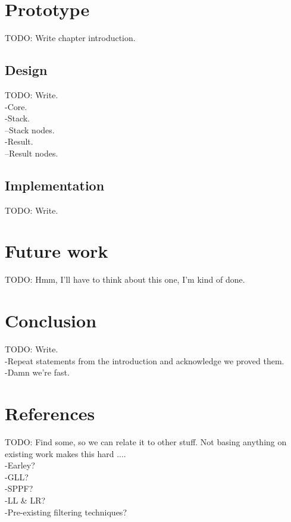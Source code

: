 \documentclass[a4paper,10pt]{article}
\begin{document}
\section{Prototype}

TODO: Write chapter introduction.

\subsection{Design}

TODO: Write.\\
-Core.\\
-Stack.\\
--Stack nodes.\\
-Result.\\
--Result nodes.

\subsection{Implementation}

TODO: Write.

\section{Future work}

TODO: Hmm, I'll have to think about this one, I'm kind of done.

\section{Conclusion}

TODO: Write.\\
-Repeat statements from the introduction and acknowledge we proved them.\\
-Damn we're fast.

\section{References}

TODO: Find some, so we can relate it to other stuff. Not basing anything on existing work makes this hard ....\\
-Earley?\\
-GLL?\\
-SPPF?\\
-LL \& LR?\\
-Pre-existing filtering techniques?
\end{document}
